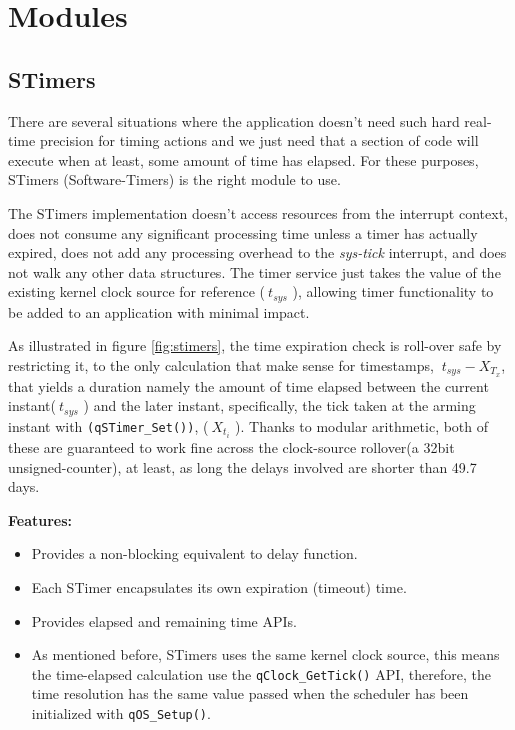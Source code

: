 \section{Modules}

\subsection{STimers}
There are several situations where the application doesn't need such hard real-time precision for timing actions and we just need that a section of code will execute when at least, some amount of time has elapsed. For these purposes, STimers (Software-Timers) is the right module to use. 

The STimers implementation doesn't access resources from the interrupt context, does not consume any significant processing time unless a timer has actually expired, does not add any processing overhead to the \textit{sys-tick} interrupt, and does not walk any other data structures. The timer service just takes the value of the existing kernel clock source for reference ($\ t_{sys}$ ), allowing timer functionality to be added to an application with minimal impact.



As illustrated in figure \ref{fig:stimers}, the time expiration check is roll-over safe by restricting it, to the only calculation that make sense for timestamps, $\ t_{sys} - X_{T_x}$, that yields a duration namely the amount of time elapsed between the current instant($\ t_{sys}$ ) and the later instant, specifically, the tick taken at the arming instant with \lstinline{(qSTimer_Set())}, ($\ X_{t_i}$ ).
Thanks to modular arithmetic, both of these are guaranteed to work fine across the clock-source rollover(a 32bit unsigned-counter), at least, as long the delays involved are shorter than 49.7 days. 
\medskip

\textbf{Features:}
\begin{itemize}
    \item Provides a non-blocking equivalent to delay function.
    \item Each STimer encapsulates its own expiration (timeout) time.
    \item Provides elapsed and remaining time APIs.
    \item As mentioned before, STimers uses the same kernel clock source, this means the time-elapsed calculation use the \lstinline{qClock_GetTick()} API, therefore, the time resolution has the same value passed when the scheduler has been initialized with \lstinline{qOS_Setup()}.
\end{itemize}

